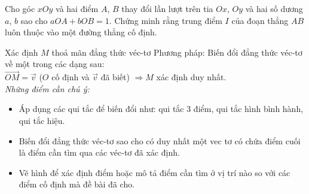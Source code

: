 \begin{bt}%
Cho góc $xOy$ và hai điểm $A$, $B$ thay đổi lần lượt trên tia $Ox$, $Oy$ và hai số dương $a$, $b$ sao cho $aOA+bOB=1$. Chứng minh rằng trung điểm $I$ của đoạn thẳng $AB$ luôn thuộc vào một đường thẳng cố định.
\end{bt}

\begin{dang}%
{Xác định $M$ thoả mãn đẳng thức véc-tơ}
Phương pháp: Biến đổi đẳng thức véc-tơ về một trong các dạng sau:\\
 $\vec{OM}=\vec{v}$ ($O$ cố định và $\vec{v}$ đã biết)
$\Rightarrow M$ xác định duy nhất.\\
\it{Những điểm cần chú ý:}
\begin{itemize}
\item Áp dụng các qui tắc để biến đổi như: qui tắc 3 điểm, qui tắc hình bình hành, qui tắc hiệu.
\item Biến đổi đẳng thức véc-tơ sao cho có duy nhất một vec tơ có chứa điểm cuối là điểm cần tìm qua các véc-tơ đã xác định.
\item Vẽ hình để xác định điểm hoặc mô tả điểm cần tìm ở vị trí nào so với các điểm cố định mà đề bài đã cho.
\end{itemize}
\end{dang}

